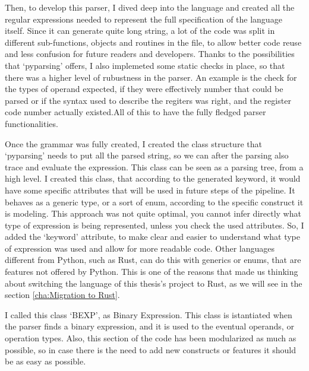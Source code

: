 Then, to develop this parser, I dived deep into the language and created all the
regular expressions needed to represent the full specification of the language itself.
Since it can generate quite long string, a lot of the code was split in different
sub-functions, objects and routines in the file, to allow better code reuse and less
confusion for future readers and developers. Thanks to the possibilities that `pyparsing'
offers, I also implemeted some static checks in place, so that there was a
higher level of rubustness in the parser. An example is the check for the types of
operand expected, if they were effectively number that could be parsed or if the
syntax used to describe the regiters was right, and the register code number actually
existed.All of this to have the fully fledged parser functionalities.

Once the grammar was fully created, I created the class structure that `pyparsing'
needs to put all the parsed string, so we can after the parsing also trace and evaluate
the expression. This class can be seen as a parsing tree, from a high level. I
created this class, that according to the generated keyword, it would have some
specific attributes that will be used in future steps of the pipeline. It behaves
as a generic type, or a sort of enum, according to the specific construct it is modeling.
This approach was not quite optimal, you cannot infer directly what type of expression
is being represented, unless you check the used attributes. So, I added the `keyword'
attribute, to make clear and easier to understand what type of expression was used
and allow for more readable code. Other languages different from Python, such as
Rust, can do this with generics or enums, that are features not offered by Python.
This is one of the reasons that made us thinking about switching the language of
this thesis's project to Rust, as we will see in the section \ref{cha:Migration
to Rust}.

I called this class `BEXP', as Binary Expression. This class is istantiated when
the parser finds a binary expression, and it is used to the eventual operands, or
operation types. Also, this section of the code has been modularized as much as possible,
so in case there is the need to add new constructs or features it should be as
easy as possible.

